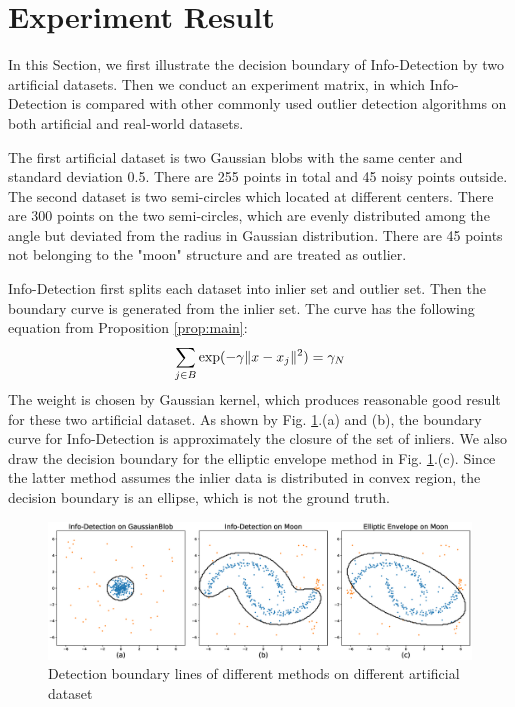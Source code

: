 \documentclass[runningheads]{llncs}
\begin{document}
\section{Experiment Result}\label{sec:Experiemt}
In this Section, we first illustrate the decision boundary of Info-Detection by two artificial datasets. Then we conduct an experiment matrix, in which Info-Detection is compared with other commonly used outlier detection algorithms on both artificial and real-world datasets.

The first artificial dataset is two Gaussian blobs with the same center and standard deviation 0.5. There are 255 points in total and 45 noisy points outside.
The second dataset is two semi-circles which located at different centers. There are 300 points on the two semi-circles, which are evenly distributed among the angle but deviated from the radius in Gaussian distribution. There are 45 points not belonging to the "moon" structure and are treated as outlier.

Info-Detection first splits each dataset into inlier set and outlier set. Then the boundary curve is generated from the inlier set. The curve has the following equation from Proposition \ref{prop:main}:
\begin{equation}
\sum_{j \in B} \exp(-\gamma \lVert x - x_j\rVert^2)= \gamma_N
\end{equation}
The weight is chosen by Gaussian kernel, which produces reasonable good result for these two artificial dataset. As shown by Fig. \ref{fig:boundary}.(a) and (b), the boundary curve for Info-Detection is approximately the closure of the set of inliers. We also draw the decision boundary for the elliptic envelope method in Fig. \ref{fig:boundary}.(c). Since the latter method assumes the inlier data is distributed in convex region, the decision boundary is an ellipse, which is not the ground truth.
\begin{figure}[!ht]
	\centering
	\includegraphics[width=\textwidth]{pic/outlier_boundary_illustration.eps}
	\caption{Detection boundary lines of different methods on different artificial dataset}	\label{fig:boundary}
\end{figure}
\end{document}
